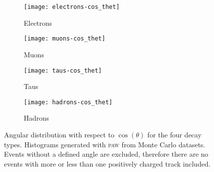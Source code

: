 
\begin{figure}
    \centering
    \begin{subfigure}[c]{0.48\linewidth}
        \centering
        \texttt{[image: electrons-cos\_thet]}
        \caption{%
            Electrons
        }
        \label{fig:paw-angle/electrons}
    \end{subfigure}
    \hfill
    \begin{subfigure}[c]{0.48\linewidth}
        \centering
        \texttt{[image: muons-cos\_thet]}
        \caption{%
            Muons
        }
        \label{fig:paw-angle/muons}
    \end{subfigure}

    \vspace{2ex}

    \begin{subfigure}[c]{0.48\linewidth}
        \centering
        \texttt{[image: taus-cos\_thet]}
        \caption{%
            Taus
        }
        \label{fig:paw-angle/taus}
    \end{subfigure}
    \hfill
    \begin{subfigure}[c]{0.48\linewidth}
        \centering
        \texttt{[image: hadrons-cos\_thet]}
        \caption{%
            Hadrons
        }
        \label{fig:paw-angle/hadrons}
    \end{subfigure}

    \caption{%
        Angular distribution with respect to $\cos(\theta)$ for the four decay
        types. Histograms generated with \textsc{paw} from Monte Carlo
        datasets. Events without a defined angle are excluded, therefore there
        are no events with more or less than one positively charged track
        included.
    }
    \label{fig:paw-angle}
\end{figure}
